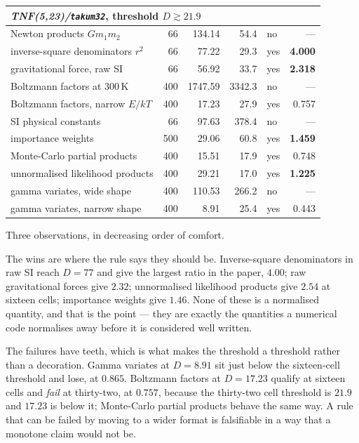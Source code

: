 \documentclass[11pt]{article}
\theoremstyle{definition}
\begin{document}
\begin{table}[htbp]
\begin{tabular}{lrrrlr}
\hline
\multicolumn{6}{l}{\emph{TNF(5,23)/\texttt{takum32}}, threshold $D \gtrsim 21.9$}\\
\hline
Newton products $Gm_1m_2$ & 66 & 134.14 & 54.4 & no & --- \\
inverse-square denominators $r^2$ & 66 & 77.22 & 29.3 & yes & \textbf{4.000} \\
gravitational force, raw SI & 66 & 56.92 & 33.7 & yes & \textbf{2.318} \\
Boltzmann factors at $300$\,K & 400 & 1747.59 & 3342.3 & no & --- \\
Boltzmann factors, narrow $E/kT$ & 400 & 17.23 & 27.9 & yes & 0.757 \\
SI physical constants & 66 & 97.63 & 378.4 & no & --- \\
importance weights & 500 & 29.06 & 60.8 & yes & \textbf{1.459} \\
Monte-Carlo partial products & 400 & 15.51 & 17.9 & yes & 0.748 \\
unnormalised likelihood products & 400 & 29.21 & 17.0 & yes & \textbf{1.225} \\
gamma variates, wide shape & 400 & 110.53 & 266.2 & no & --- \\
gamma variates, narrow shape & 400 & 8.91 & 25.4 & yes & 0.443 \\
\hline
\end{tabular}
\end{table}

Three observations, in decreasing order of comfort.

The wins are where the rule says they should be. Inverse-square denominators in
raw SI reach $D = 77$ and give the largest ratio in the paper, $4.00$; raw
gravitational forces give $2.32$; unnormalised likelihood products give $2.54$ at
sixteen cells; importance weights give $1.46$. None of these is a normalised
quantity, and that is the point --- they are exactly the quantities a numerical
code normalises away before it is considered well written.

The failures have teeth, which is what makes the threshold a threshold rather
than a decoration. Gamma variates at $D = 8.91$ sit just below the sixteen-cell
threshold and lose, at $0.865$. Boltzmann factors at $D = 17.23$ qualify at
sixteen cells and \emph{fail} at thirty-two, at $0.757$, because the thirty-two
cell threshold is $21.9$ and $17.23$ is below it; Monte-Carlo partial products
behave the same way. A rule that can be failed by moving to a wider format is
falsifiable in a way that a monotone claim would not be.
\end{document}
